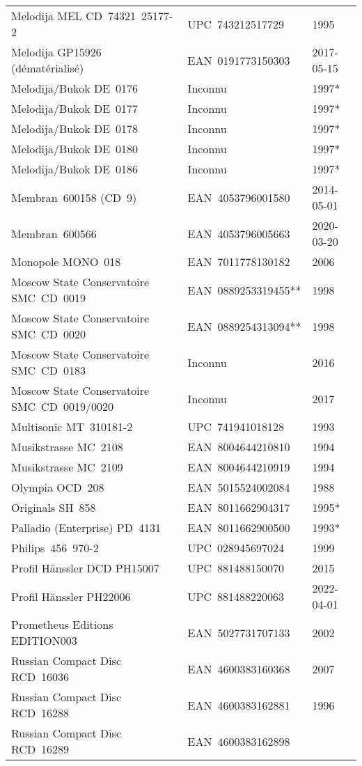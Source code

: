 {\begin{longtable}[c]{lll}
 Melodija MEL CD~74321~\hbox{25177-2}
 & UPC~743212517729
 & 1995 \\
 Melodija GP15926 (dématérialisé)
 & EAN~0191773150303
 & 2017-05-15 \\
 Melodija/Bukok DE~0176
 & Inconnu
 & 1997* \\
 Melodija/Bukok DE~0177
 & Inconnu
 & 1997* \\
 Melodija/Bukok DE~0178
 & Inconnu
 & 1997* \\
 Melodija/Bukok DE~0180
 & Inconnu
 & 1997* \\
 Melodija/Bukok DE~0186
 & Inconnu
 & 1997* \\
 Membran~600158 (CD~9)
 & EAN~4053796001580
 & 2014-05-01 \\
 Membran~600566
 & EAN~4053796005663
 & 2020-03-20 \\
 Monopole MONO~018
 & EAN~7011778130182
 & 2006 \\
 Moscow State Conservatoire SMC~CD~0019
 & EAN~0889253319455**
 & 1998 \\
 Moscow State Conservatoire SMC~CD~0020
 & EAN~0889254313094**
 & 1998 \\
 Moscow State Conservatoire SMC~CD~0183
 & Inconnu
 & 2016 \\
 Moscow State Conservatoire SMC~CD~0019/0020
 & Inconnu
 & 2017 \\
 Multisonic MT~\hbox{310181-2}
 & UPC~741941018128
 & 1993 \\
 Musikstrasse MC~2108
 & EAN~8004644210810
 & 1994 \\
 Musikstrasse MC~2109
 & EAN~8004644210919
 & 1994 \\
 Olympia OCD~208
 & EAN~5015524002084
 & 1988 \\
 Originals SH~858
 & EAN~8011662904317
 & 1995* \\
 Palladio (Enterprise) PD~4131
 & EAN~8011662900500
 & 1993* \\
 Philips~456~\hbox{970-2}
 & UPC~028945697024
 & 1999 \\
 Profil Hänssler DCD PH15007
 & UPC~881488150070
 & 2015 \\
 Profil Hänssler PH22006
 & UPC~881488220063
 & 2022-04-01 \\
 Prometheus Editions EDITION003
 & EAN~5027731707133
 & 2002 \\
 Russian Compact Disc RCD~16036
 & EAN~4600383160368
 & 2007 \\
 Russian Compact Disc RCD~16288
 & EAN~4600383162881
 & 1996 \\
 Russian Compact Disc RCD~16289
 & EAN~4600383162898

\end{longtable}}
